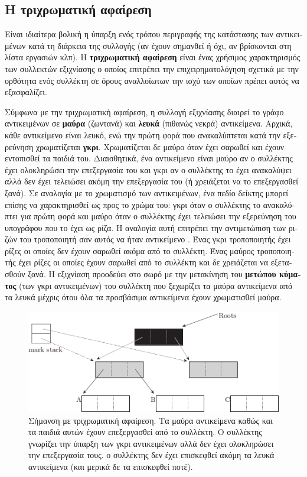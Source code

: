 \begin{greek}
\section{Η τριχρωματική αφαίρεση}
Είναι ιδιαίτερα βολική η ύπαρξη ενός τρόπου περιγραφής της
κατάστασης των αντικειμένων κατά τη διάρκεια της συλλογής
(αν έχουν σημανθεί ή όχι, αν βρίσκονται στη λίστα εργασιών
κλπ). Η \textbf{τριχρωματική αφαίρεση}  είναι ένας χρήσιμος χαρακτηρισμός
των συλλεκτών εξιχνίασης ο οποίος επιτρέπει την 
επιχειρηματολόγηση σχετικά με την ορθότητα ενός συλλέκτη
σε όρους αναλλοίωτων την ισχύ των οποίων πρέπει αυτός να
εξασφαλίζει. 

Σύμφωνα με την τριχρωματική αφαίρεση, η συλλογή εξιχνίασης
διαιρεί το γράφο αντικειμένων σε \textbf{μαύρα} (ζωντανά) 
και \textbf{λευκά} (πιθανώς νεκρά) αντικείμενα. Αρχικά, κάθε
αντικείμενο είναι λευκό, ενώ την πρώτη φορά που ανακαλύπτεται
κατά την εξερεύνηση χρωματίζεται \textbf{γκρι}. Χρωματίζεται
δε μαύρο όταν έχει σαρωθεί και έχουν εντοπισθεί τα παιδιά του.
Διαισθητικά, ένα αντικείμενο είναι μαύρο αν ο συλλέκτης έχει
ολοκληρώσει την επεξεργασία του και γκρι αν ο συλλέκτης το
έχει ανακαλύψει αλλά δεν έχει τελειώσει ακόμη την επεξεργασία
του (ή χρειάζεται να το επεξεργασθεί ξανά). Σε αναλογία με
το χρωματισμό των αντικειμένων, ένα πεδίο δείκτης μπορεί 
επίσης να χαρακτηρισθεί ως προς το χρώμα του: γκρι όταν ο
συλλέκτης το ανακαλύπτει για πρώτη φορά και μαύρο όταν ο
συλλέκτης έχει τελειώσει την εξερεύνηση του υπογράφου που
το έχει ως ρίζα.  Η αναλογία αυτή επιτρέπει την αντιμετώπιση
των ριζών του τροποποιητή σαν αυτός να ήταν αντικείμενο
\cite{DBLP:conf/iwmm/Pirinen98}. Ένας γκρι τροποποιητής έχει
ρίζες οι οποίες δεν έχουν σαρωθεί ακόμα από το συλλέκτη. 
Ένας μαύρος τροποποιητής έχει ρίζες οι οποίες έχουν σαρωθεί
από το συλλέκτη και δε χρειάζεται να εξετασθούν ξανά. Η
εξιχνίαση προοδεύει στο σωρό με την μετακίνηση του
\textbf{μετώπου κύματος} (των γκρι αντικειμένων)
του συλλέκτη που ξεχωρίζει τα μαύρα αντικείμενα από τα
λευκά μέχρις ότου όλα τα προσβάσιμα αντικείμενα έχουν
χρωματισθεί μαύρα.

\begin{figure}[H]
  \centering
  \includegraphics{figures/mrkswp_1}
  \caption[Σήμανση με τριχρωματική αφαίρεση]
    {Σήμανση με τριχρωματική αφαίρεση. Τα μαύρα αντικείμενα καθώς
     και τα παιδιά αυτών έχουν επεξεργασθεί από το συλλέκτη. Ο
     συλλέκτης γνωρίζει την ύπαρξη των γκρι αντικειμένων αλλά
     δεν έχει ολοκληρώσει την επεξεργασία τους. ο συλλέκτης δεν
     έχει επισκεφθεί ακόμη τα λευκά αντικείμενα (και μερικά δε
     τα επισκεφθεί ποτέ).}
  \label{fig:mrkswp_1}
\end{figure}


\end{greek}
